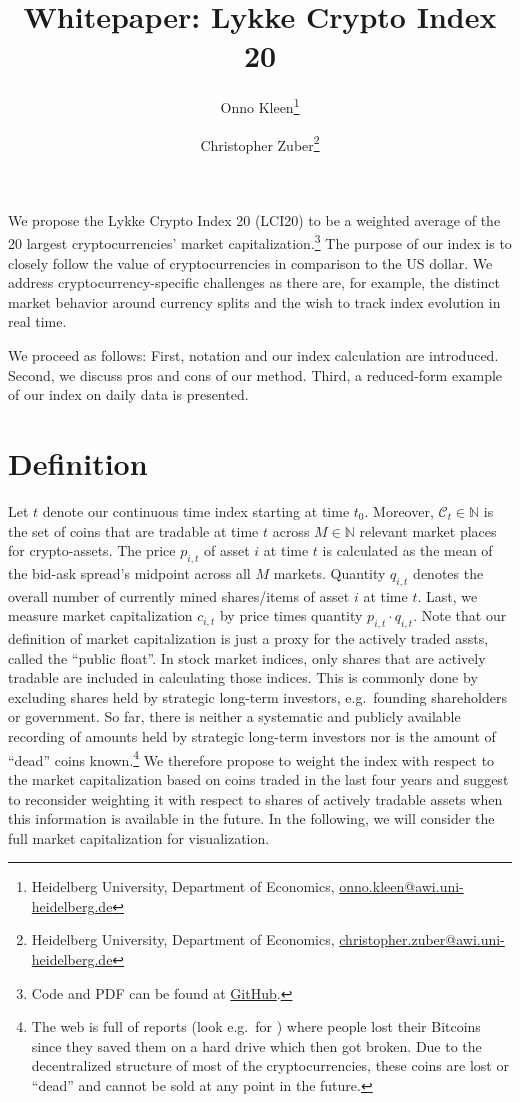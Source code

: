 \documentclass[11pt]{article}
\title{Whitepaper: Lykke Crypto Index 20}
\author{
Onno Kleen\thanks{Heidelberg University, Department of Economics, \href{mailto:onno.kleen@awi.uni-heidelberg.de}{onno.kleen@awi.uni-heidelberg.de}}
\and
Christopher Zuber\thanks{Heidelberg University, Department of Economics, \href{mailto:christopher.zuber@awi.uni-heidelberg.de}{christopher.zuber@awi.uni-heidelberg.de}}
}
\begin{document}
\maketitle


We propose the Lykke Crypto Index 20 (LCI20) to be a weighted average of the 20 largest cryptocurrencies' market capitalization.\footnote{Code and PDF can be found at \href{https://github.com/onnokleen/crypto-index}{GitHub}.}
The purpose of our index is to closely follow the value of cryptocurrencies in comparison to the US dollar.
We address cryptocurrency-specific challenges as there are, for example, the distinct market behavior around currency splits and the wish to track index evolution in real time.

We proceed as follows:
First, notation and our index calculation are introduced.
Second, we discuss pros and cons of our method.
Third, a reduced-form example of our index on daily data is presented.


\section{Definition}

Let $t$ denote our continuous time index starting at time $t_0$.
Moreover, $\mathcal{C}_t \in \mathbb{N}$ is the set of coins that are tradable at time $t$ across $M \in \mathbb{N}$ relevant market places for crypto-assets.
The price $p_{i,t}$ of asset $i$ at time $t$ is calculated as the mean of the bid-ask spread's midpoint across all $M$ markets.
Quantity $q_{i,t}$ denotes the overall number of currently mined shares/items of asset $i$ at time $t$.
Last, we measure market capitalization $c_{i,t}$ by price times quantity $p_{i,t} \cdot q_{i,t}$.
Note that our definition of market capitalization is just a proxy for the actively traded assts, called the ``public float''.
In stock market indices, only shares that are actively tradable are included in calculating those indices.
This is commonly done by excluding shares held by strategic long-term investors, e.g.\ founding shareholders or government.
So far, there is neither a systematic and publicly available recording of amounts held by strategic long-term investors nor is the amount of ``dead'' coins known.\footnote{The web is full of reports (look e.g.\ for \citeauthor{Zombiecoins}) where people lost their Bitcoins since they saved them on a hard drive which then got broken. Due to the decentralized structure of most of the cryptocurrencies, these coins are lost or ``dead'' and cannot be sold at any point in the future.}
We therefore propose to weight the index with respect to the market capitalization based on coins traded in the last four years and suggest to reconsider weighting it with respect to shares of actively tradable assets when this information is available in the future.
In the following, we will consider the full market capitalization for visualization.
\end{document}
